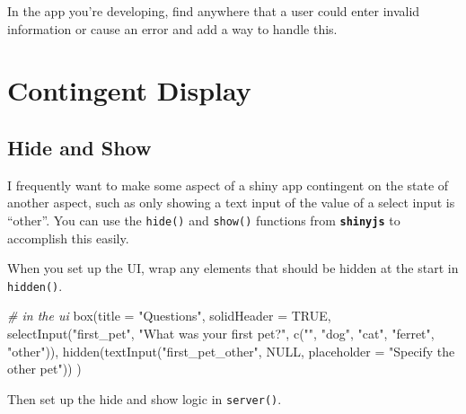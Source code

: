\documentclass[
  oneside]{book}
\newenvironment{Shaded}{\begin{snugshade}}{\end{snugshade}}
\newcommand{\AttributeTok}[1]{\textcolor[rgb]{0.77,0.63,0.00}{#1}}
\newcommand{\CommentTok}[1]{\textcolor[rgb]{0.56,0.35,0.01}{\textit{#1}}}
\newcommand{\ConstantTok}[1]{\textcolor[rgb]{0.00,0.00,0.00}{#1}}
\newcommand{\ControlFlowTok}[1]{\textcolor[rgb]{0.13,0.29,0.53}{\textbf{#1}}}
\newcommand{\FunctionTok}[1]{\textcolor[rgb]{0.00,0.00,0.00}{#1}}
\newcommand{\NormalTok}[1]{#1}
\newcommand{\SpecialCharTok}[1]{\textcolor[rgb]{0.00,0.00,0.00}{#1}}
\newcommand{\StringTok}[1]{\textcolor[rgb]{0.31,0.60,0.02}{#1}}
\begin{document}
In the app you're developing, find anywhere that a user could enter invalid information or cause an error and add a way to handle this.

\hypertarget{contingency}{%
\chapter{Contingent Display}\label{contingency}}

\hypertarget{hide-and-show}{%
\section{Hide and Show}\label{hide-and-show}}

I frequently want to make some aspect of a shiny app contingent on the state of another aspect, such as only showing a text input of the value of a select input is ``other''. You can use the \texttt{hide}\texttt{()} and \texttt{show}\texttt{()} functions from \textbf{\texttt{shinyjs}} to accomplish this easily.

When you set up the UI, wrap any elements that should be hidden at the start in \texttt{hidden}\texttt{()}.

\begin{Shaded}
\begin{Highlighting}[]
\CommentTok{\# in the ui}
\FunctionTok{box}\NormalTok{(}\AttributeTok{title =} \StringTok{"Questions"}\NormalTok{,}
    \AttributeTok{solidHeader =} \ConstantTok{TRUE}\NormalTok{,}
    \FunctionTok{selectInput}\NormalTok{(}\StringTok{"first\_pet"}\NormalTok{, }\StringTok{"What was your first pet?"}\NormalTok{, }
                \FunctionTok{c}\NormalTok{(}\StringTok{""}\NormalTok{, }\StringTok{"dog"}\NormalTok{, }\StringTok{"cat"}\NormalTok{, }\StringTok{"ferret"}\NormalTok{, }\StringTok{"other"}\NormalTok{)),}
    \FunctionTok{hidden}\NormalTok{(}\FunctionTok{textInput}\NormalTok{(}\StringTok{"first\_pet\_other"}\NormalTok{, }\ConstantTok{NULL}\NormalTok{, }
                     \AttributeTok{placeholder =} \StringTok{"Specify the other pet"}\NormalTok{))}
\NormalTok{)}
\end{Highlighting}
\end{Shaded}

Then set up the hide and show logic in \texttt{server}\texttt{()}.

\begin{Shaded}
\end{Shaded}
\end{document}
